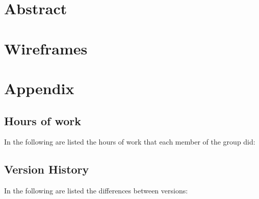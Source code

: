 \documentclass{../Common/Structure/doc_pdf}
\begin{document}
\titleToc

\chapter{Abstract}
\chapter{Wireframes}
\appendix
\chapter{Appendix}
\section{Hours of work}
In the following are listed the hours of work that each member of the group did:
\newpage
\section{Version History}
In the following are listed the differences between versions:
\end{document}
